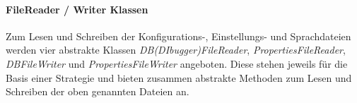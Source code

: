 \documentclass[parskip=full]{scrartcl}
\begin{document}

\paragraph{FileReader / Writer Klassen}
Zum Lesen und Schreiben der Konfigurations-, Einstellungs- und Sprachdateien werden vier abstrakte Klassen \textit{DB(DIbugger)FileReader}, \textit{PropertiesFileReader}, \textit{DBFileWriter} und \textit{PropertiesFileWriter}
angeboten. Diese stehen jeweils für die Basis einer Strategie und bieten zusammen abstrakte Methoden zum Lesen und Schreiben der oben genannten Dateien an.
\end{document}
